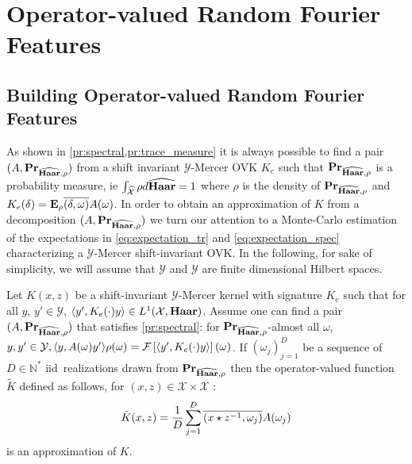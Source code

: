\section{Operator-valued Random Fourier Features}
\label{sec:building_ORFF} 
\subsection{Building Operator-valued Random Fourier Features}

As shown in \cref{pr:spectral,pr:trace_measure} it is
always possible to find a pair $(A, {\mathbf{{Pr}}}_{\widehat{\mathbf{Haar}},\rho})$ from a
shift invariant $\mathcal{Y}$-Mercer \acl{OVK} $K_e$ such that
${\mathbf{{Pr}}}_{\widehat{\mathbf{Haar}},\rho}$ is a probability measure, \acs{ie}
$\int_{\widehat{\mathcal{X}}} \rho d\widehat{\mathbf{Haar}}=1$ where $\rho$ is the density of
${\mathbf{{Pr}}}_{\widehat{\mathbf{Haar}},\rho}$ and
$K_e(\delta)={\mathbf{{E}}}_\rho{\overline{(\delta,\omega)}A(\omega)}$. In
order to obtain an approximation of $K$ from a decomposition $(A,
{\mathbf{{Pr}}}_{\widehat{\mathbf{Haar}},\rho})$ we turn our attention to a Monte-Carlo
estimation of the expectations in \cref{eq:expectation_tr} and
\cref{eq:expectation_spec} characterizing a $\mathcal{Y}$-Mercer
shift-invariant \acl{OVK}. In the following, for sake of simplicity, we will
assume that $\mathcal{Y}$ and $\mathcal{Y}$ are finite dimensional Hilbert
spaces.
\begin{proposition}
    \label{cr:ORFF-kernel} Let $K(x,z)$ be a shift-invariant
    $\mathcal{Y}$-Mercer kernel with signature $K_e$ such that for all $y$,
    $y'\in\mathcal{Y}$, $\langle y', K_e(\cdot)y\rangle\in L^1(\mathcal{X},\mathbf{Haar})$.
    Assume one can find a pair $(A, {\mathbf{{Pr}}}_{\widehat{\mathbf{Haar}},\rho})$ that
    satisfies \cref{pr:spectral}:   for
    ${\mathbf{{Pr}}}_{\widehat{\mathbf{Haar}},\rho}$-almost all $\omega$, $y,
    y'\in\mathcal{Y}, \langle y, A(\omega)y'\rangle\rho(\omega)=\mathcal{F}\left[\langle y',
    K_e(\cdot)y\rangle\right](\omega)$. If $(\omega_j)_{j=1}^D$ be a sequence of
    $D\in\mathbb{N}^*$ \acs{iid}~realizations drawn from
    ${\mathbf{{Pr}}}_{\widehat{\mathbf{Haar}},\rho}$ then the operator-valued function
    $\tilde{K}$ defined as follows, for $(x,z) \in \mathcal{X}\times
    \mathcal{X}$ :
    \begin{dmath*}
        \tilde{K}(x,z)= \frac{1}{D} \sum_{j=1}^D
        \conj{\pairing{x\groupop\inv{z},\omega_j}} A(\omega_j)
    \end{dmath*}
    is an approximation of $K$.
\end{proposition}
